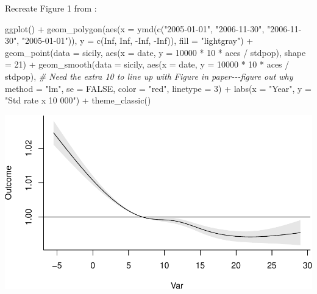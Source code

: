 \documentclass[
]{book}
\newenvironment{Shaded}{\begin{snugshade}}{\end{snugshade}}
\newcommand{\AttributeTok}[1]{\textcolor[rgb]{0.77,0.63,0.00}{#1}}
\newcommand{\CommentTok}[1]{\textcolor[rgb]{0.56,0.35,0.01}{\textit{#1}}}
\newcommand{\ConstantTok}[1]{\textcolor[rgb]{0.00,0.00,0.00}{#1}}
\newcommand{\DecValTok}[1]{\textcolor[rgb]{0.00,0.00,0.81}{#1}}
\newcommand{\FunctionTok}[1]{\textcolor[rgb]{0.00,0.00,0.00}{#1}}
\newcommand{\NormalTok}[1]{#1}
\newcommand{\SpecialCharTok}[1]{\textcolor[rgb]{0.00,0.00,0.00}{#1}}
\newcommand{\StringTok}[1]{\textcolor[rgb]{0.31,0.60,0.02}{#1}}
\begin{document}
Recreate Figure 1 from \citet{bernal2017interrupted}:

\begin{Shaded}
\begin{Highlighting}[]
\FunctionTok{ggplot}\NormalTok{() }\SpecialCharTok{+} 
  \FunctionTok{geom\_polygon}\NormalTok{(}\FunctionTok{aes}\NormalTok{(}\AttributeTok{x =} \FunctionTok{ymd}\NormalTok{(}\FunctionTok{c}\NormalTok{(}\StringTok{"2005{-}01{-}01"}\NormalTok{, }\StringTok{"2006{-}11{-}30"}\NormalTok{, }
                         \StringTok{"2006{-}11{-}30"}\NormalTok{, }\StringTok{"2005{-}01{-}01"}\NormalTok{)), }
               \AttributeTok{y =} \FunctionTok{c}\NormalTok{(}\ConstantTok{Inf}\NormalTok{, }\ConstantTok{Inf}\NormalTok{, }\SpecialCharTok{{-}}\ConstantTok{Inf}\NormalTok{, }\SpecialCharTok{{-}}\ConstantTok{Inf}\NormalTok{)), }\AttributeTok{fill =} \StringTok{"lightgray"}\NormalTok{) }\SpecialCharTok{+} 
  \FunctionTok{geom\_point}\NormalTok{(}\AttributeTok{data =}\NormalTok{ sicily, }
             \FunctionTok{aes}\NormalTok{(}\AttributeTok{x =}\NormalTok{ date, }\AttributeTok{y =} \DecValTok{10000} \SpecialCharTok{*} \DecValTok{10} \SpecialCharTok{*}\NormalTok{ aces }\SpecialCharTok{/}\NormalTok{ stdpop), }\AttributeTok{shape =} \DecValTok{21}\NormalTok{) }\SpecialCharTok{+} 
  \FunctionTok{geom\_smooth}\NormalTok{(}\AttributeTok{data =}\NormalTok{ sicily, }
              \FunctionTok{aes}\NormalTok{(}\AttributeTok{x =}\NormalTok{ date, }\AttributeTok{y =} \DecValTok{10000} \SpecialCharTok{*} \DecValTok{10} \SpecialCharTok{*}\NormalTok{ aces }\SpecialCharTok{/}\NormalTok{ stdpop), }\CommentTok{\# Need the extra 10 to line up with Figure in paper{-}{-}{-}figure out why}
              \AttributeTok{method =} \StringTok{"lm"}\NormalTok{, }\AttributeTok{se =} \ConstantTok{FALSE}\NormalTok{, }\AttributeTok{color =} \StringTok{"red"}\NormalTok{, }\AttributeTok{linetype =} \DecValTok{3}\NormalTok{) }\SpecialCharTok{+} 
  \FunctionTok{labs}\NormalTok{(}\AttributeTok{x =} \StringTok{"Year"}\NormalTok{, }\AttributeTok{y =} \StringTok{"Std rate x 10 000"}\NormalTok{) }\SpecialCharTok{+} 
  \FunctionTok{theme\_classic}\NormalTok{()}
\end{Highlighting}
\end{Shaded}

\includegraphics{adv_epi_analysis_files/figure-latex/unnamed-chunk-111-1.pdf}
\end{document}
